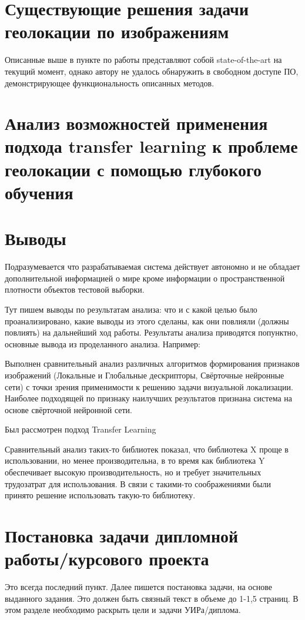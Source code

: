 \section{Существующие решения задачи геолокации по изображениям}

Описанные выше в пункте по работы \cite{weyand2016planet} представляют собой state-of-the-art на текущий момент, однако автору не удалось обнаружить в свободном доступе ПО, демонстрирующее функциональность описанных методов. 


\section{Анализ возможностей применения подхода transfer learning к проблеме геолокации с помощью глубокого обучения}



\section{Выводы}

Подразумевается что разрабатываемая система действует автономно и не обладает дополнительной информацией о мире кроме информации о пространственной плотности объектов тестовой выборки.

Тут пишем выводы по результатам анализа: что и с какой целью было проанализировано, какие выводы из этого сделаны, как они повлияли (должны повлиять) на дальнейший ход работы. Результаты анализа приводятся попунктно, основные вывода из проделанного анализа. Например:

\begin{compactenum}
	\item Выполнен сравнительный анализ различных алгоритмов формирования признаков изображений (Локальные и Глобальные дескрипторы, Свёрточные нейронные сети) с точки зрения применимости к решению задачи визуальной локализации. Наиболее подходящей по признаку наилучших результатов признана система на основе свёрточной нейронной сети.
	\item Был рассмотрен подход Transfer Learning 
	\item Сравнительный анализ таких-то библиотек показал, что библиотека X проще в использовании, но менее производительна, в то время как библиотека Y обеспечивает высокую производительность, но и требует значительных трудозатрат для использования. В связи с такими-то соображениями были принято решение использовать такую-то библиотеку.
\end{compactenum}



\section{Постановка задачи дипломной работы/курсового проекта}

Это всегда последний пункт. Далее пишется постановка задачи, на основе выданного задания. Это должен быть связный текст в объеме до 1-1,5 страниц. В этом разделе необходимо раскрыть цели и задачи УИРа/диплома. 

